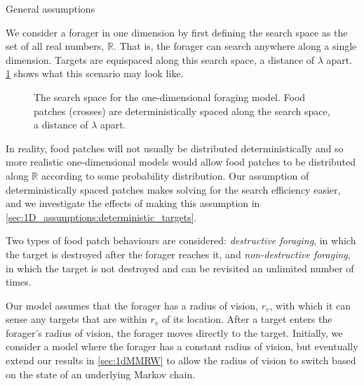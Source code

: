 \begin{section}{General assumptions}
\label{sec:1D_introduction}

We consider a forager in one dimension by first defining the search space as the set of all real numbers, $\mathbb{R}$.
That is, the forager can search anywhere along a single dimension.
Targets are equispaced along this search space, a distance of $\lambda$ apart.
\cref{fig:1dmodels:searchspace} shows what this scenario may look like.

\usetikzlibrary{shapes.misc}
\begin{figure}[H]
	\centering
	\caption[The full search space for the one-dimensional model]{The search space for the one-dimensional foraging model.
	Food patches (crosses) are deterministically spaced along the search space, a distance of $\lambda$ apart.
	\label{fig:1dmodels:searchspace}}
\end{figure}

In reality, food patches will not usually be distributed deterministically and so more realistic one-dimensional models would allow food patches to be distributed along $\mathbb{R}$ according to some probability distribution.
Our assumption of deterministically spaced patches makes solving for the search efficiency easier, and we investigate the effects of making this assumption in \cref{sec:1D_assumptions:deterministic_targets}.

Two types of food patch behaviours are considered: \emph{destructive foraging}, in which the target is destroyed after the forager reaches it, and \emph{non-destructive foraging}, in which the target is not destroyed and can be revisited an unlimited number of times.

Our model assumes that the forager has a radius of vision, $r_v$, with which it can sense any targets that are within $r_v$ of its location.
After a target enters the forager's radius of vision, the forager moves directly to the target.
Initially, we consider a model where the forager has a constant radius of vision, but eventually extend our results in \cref{sec:1dMMRW} to allow the radius of vision to switch based on the state of an underlying Markov chain.


\end{section}

